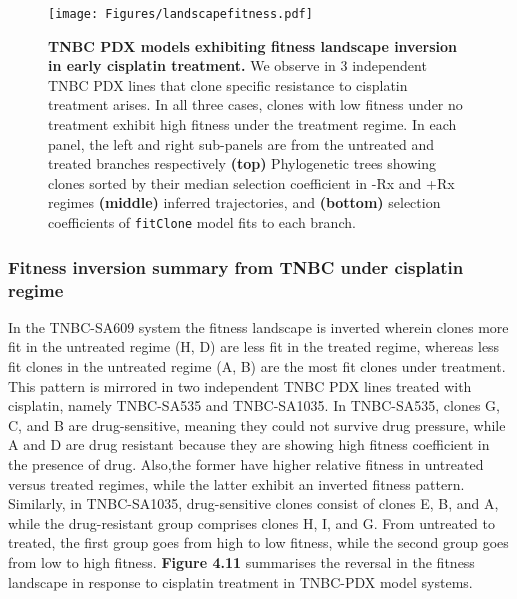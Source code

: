 \begin{figure}
\centering
\texttt{[image: Figures/landscapefitness.pdf]}
	
\caption[Fitness landscape reversal in early cisplatin treatment in TNBC PDX models.]
	{\small
	\textbf{TNBC PDX models exhibiting fitness landscape inversion in early cisplatin treatment.}
	     We observe in 3 independent TNBC PDX lines that clone specific resistance to cisplatin treatment arises. In all three cases, clones with low fitness under no treatment exhibit high fitness under the treatment regime. In each panel, the left and right sub-panels are from the untreated and treated branches respectively \textbf{(top)} Phylogenetic trees showing clones sorted by their median selection coefficient in -Rx and +Rx regimes  \textbf{(middle)} inferred trajectories, and  \textbf{(bottom)} selection coefficients of \texttt{fitClone} model fits to each branch.
	}
	\label{fig:landscapefitness}
\end{figure}


\subsubsection{Fitness inversion summary from TNBC under cisplatin regime }
In the TNBC-SA609 system the fitness landscape is inverted wherein
clones more fit in the untreated regime (H, D) are less fit in the treated regime, whereas less fit clones in the untreated regime (A, B) are the most fit clones under treatment. This pattern is
mirrored in two independent TNBC PDX lines treated with cisplatin, namely TNBC-SA535 and TNBC-SA1035. In TNBC-SA535, clones G, C, and B are drug-sensitive, meaning they could not survive drug pressure, while A and D are drug resistant because they are showing high fitness coefficient in the presence of drug. Also,the former have higher relative fitness in untreated versus treated regimes, while the latter exhibit an inverted fitness pattern. Similarly, in TNBC-SA1035, drug-sensitive clones consist of clones E, B, and A, while the drug-resistant group comprises clones H, I, and G. From untreated
to treated, the first group goes from high to low fitness, while the second group goes from low to high fitness. \textbf{Figure 4.11} summarises the reversal in the fitness landscape in response to cisplatin treatment in TNBC-PDX model systems.



